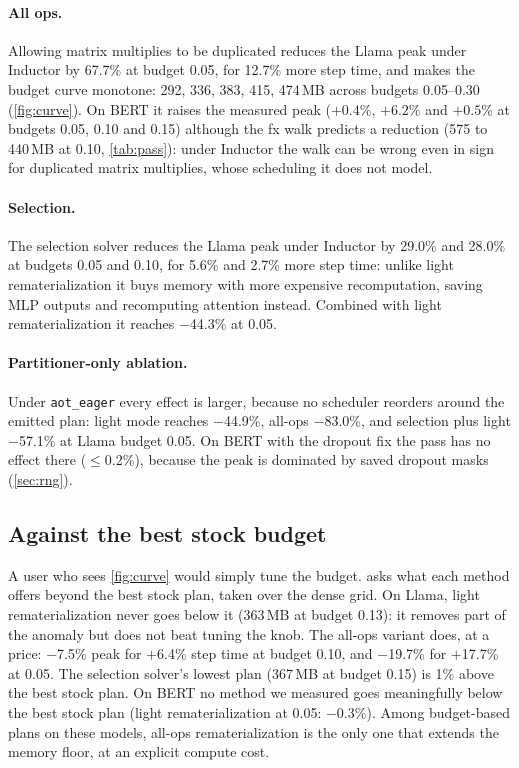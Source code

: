 \documentclass[10pt]{article}
\newcommand{\code}[1]{\texttt{#1}}
\begin{document}
\paragraph{All ops.} Allowing matrix multiplies to be duplicated reduces the Llama peak under Inductor by 67.7\% at budget
0.05, for 12.7\% more step time, and makes the budget curve monotone: 292, 336, 383, 415, 474\,MB across budgets
0.05--0.30 (\cref{fig:curve}). On BERT it raises the measured peak ($+0.4\%$, $+6.2\%$ and $+0.5\%$ at budgets 0.05, 0.10 and 0.15) although the
fx walk predicts a reduction (575 to 440\,MB at 0.10, \cref{tab:pass}): under Inductor the walk can be wrong even in
sign for duplicated matrix multiplies, whose scheduling it does not model.

\paragraph{Selection.} The selection solver reduces the Llama peak under Inductor by 29.0\% and 28.0\% at budgets 0.05
and 0.10, for 5.6\% and 2.7\% more step time: unlike light rematerialization it buys memory with more expensive
recomputation, saving MLP outputs and recomputing attention instead. Combined with light rematerialization it reaches
$-$44.3\% at 0.05.

\paragraph{Partitioner-only ablation.} Under \code{aot\_eager} every effect is larger, because no scheduler reorders
around the emitted plan: light mode reaches $-$44.9\%, all-ops $-$83.0\%, and selection plus light $-$57.1\% at Llama
budget 0.05. On BERT with the dropout fix the pass has no effect there ($\le$0.2\%), because the peak is dominated by
saved dropout masks (\cref{sec:rng}).

\subsection{Against the best stock budget}
A user who sees \cref{fig:curve} would simply tune the budget.  asks what each method offers beyond
the best stock plan, taken over the dense grid. On Llama, light rematerialization never goes below it (363\,MB at budget
0.13): it removes part of the anomaly but does not beat tuning the knob. The all-ops variant does, at a price: $-$7.5\%
peak for $+$6.4\% step time at budget 0.10, and $-$19.7\% for $+$17.7\% at 0.05. The selection solver's lowest plan
(367\,MB at budget 0.15) is 1\% above the best stock plan. On BERT no method we measured goes meaningfully below the best
stock plan (light rematerialization at 0.05: $-0.3\%$). Among budget-based plans on these models, all-ops rematerialization is the only one
that extends the memory floor, at an explicit compute cost.
\end{document}
